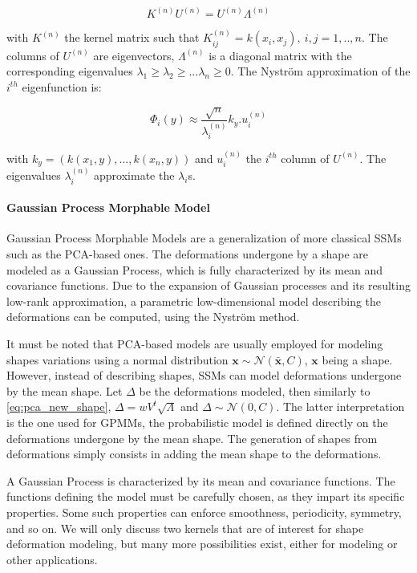 \begin{equation}
	K^{(n)}U^{(n)} = U^{(n)}\Lambda^{(n)}
\end{equation}

with $K^{(n)}$ the kernel matrix such that $K_{ij}^{(n)} = k(x_i, x_j), \ i, j =1,..,n$. The columns of $U^{(n)}$ are eigenvectors, $\Lambda^{(n)}$ is a diagonal matrix with the corresponding eigenvalues $\lambda_1 \geq \lambda_2\geq ... \lambda_n \geq 0$. The Nyström approximation of the $i^{th}$ eigenfunction is: 

\begin{equation}
	\Phi_i(y) \approx \frac{\sqrt{n}}{\lambda_i^{(n)}} k_y.u_i^{(n)}
\end{equation} 

with $k_y = (k(x_1, y), ..., k(x_n, y))$ and $u_i^{(n)}$ the $i^{th}$ column of $U^{(n)}$. The eigenvalues $\lambda_i^{(n)}$ approximate the $\lambda_i$s.



\paragraph{Gaussian Process Morphable Model}

Gaussian Process Morphable Models are a generalization of more classical SSMs such as the PCA-based ones. The deformations undergone by a shape are modeled as a Gaussian Process, which is fully characterized by its mean and covariance functions. Due to the \kl* expansion of Gaussian processes and its resulting low-rank approximation, a parametric low-dimensional model describing the deformations can be computed, using the Nyström method. 

It must be noted that PCA-based models are usually employed for modeling shapes variations using a normal distribution $\mathbf{x} \sim \mathcal{N}(\bar{\mathbf{x}}, C)$, $\mathbf{x}$ being a shape. However, instead of describing shapes, SSMs can model deformations undergone by the mean shape. Let $\Delta$ be the deformations modeled, then similarly to \eqref{eq:pca_new_shape}, $\Delta =  wV^t\sqrt{\Lambda}$ and $\Delta \sim \mathcal{N}(0,C)$.
The latter interpretation is the one used for GPMMs, the probabilistic model is defined directly on the deformations undergone by the mean shape. The generation of shapes from deformations simply consists in adding the mean shape to the deformations. 

A Gaussian Process is characterized by its mean and covariance functions. The functions defining the model must be carefully chosen, as they impart its specific properties. Some such properties can enforce smoothness, periodicity, symmetry, and so on. We will only discuss two kernels that are of interest for shape deformation modeling, but many more possibilities exist, either for modeling or other applications. 


